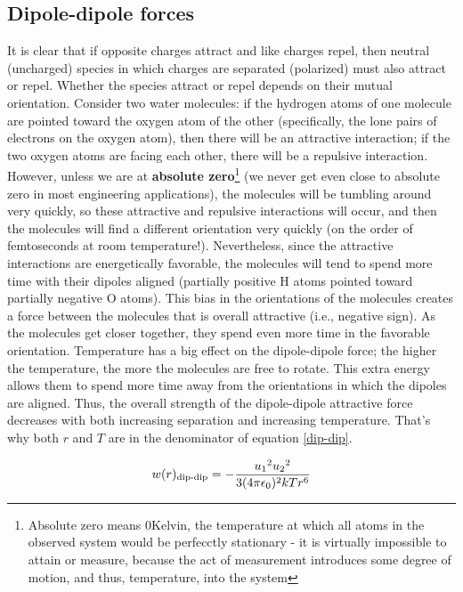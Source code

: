     \subsection{Dipole-dipole forces} 

    It is clear that if opposite charges attract and like charges repel, then neutral (uncharged) species in which charges are separated (polarized) must also attract or repel. Whether the species attract or repel depends on their mutual orientation. Consider two water molecules: if the hydrogen atoms of one molecule are pointed toward the oxygen atom of the other (specifically, the lone pairs of electrons on the oxygen atom), then there will be an attractive interaction; if the two oxygen atoms are facing each other, there will be a repulsive interaction. However, unless we are at \textbf{absolute zero}\footnote{Absolute zero means 0\degree Kelvin, the temperature at which all atoms in the observed system would be perfecctly stationary - it is virtually impossible to attain or measure, because the act of measurement introduces some degree of motion, and thus, temperature, into the system} (we never get even close to absolute zero in most engineering applications), the molecules will be tumbling around very quickly, so these attractive and repulsive interactions will occur, and then the molecules will find a different orientation very quickly (on the order of femtoseconds at room temperature!). Nevertheless, since the attractive interactions are energetically favorable, the molecules will tend to spend more time with their dipoles aligned (partially positive H atoms pointed toward partially negative O atoms). This bias in the orientations of the molecules creates a force between the molecules that is overall attractive (i.e., negative sign). As the molecules get closer together, they spend even more time in the favorable orientation. Temperature has a big effect on the dipole-dipole force; the higher the temperature, the more the molecules are free to rotate. This extra energy allows them to spend more time away from the orientations in which the dipoles are aligned. Thus, the overall strength of the dipole-dipole attractive force decreases with both increasing separation and increasing temperature. That's why both $r$ and $T$ are in the denominator of equation \ref{dip-dip}.

    \begin{equation}
    \label{dip-dip}
        w(r)\textsubscript{dip-dip}=-\frac{u\textsubscript{1}^{2}u\textsubscript{2}^{2}}{3(4\pi\epsilon\textsubscript{0})^{2}kTr^{6}}
    \end{equation}

